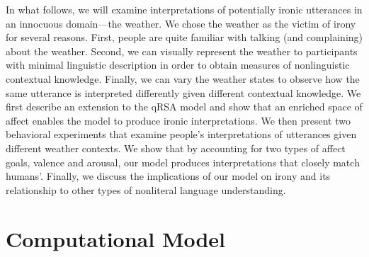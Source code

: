 \documentclass[10pt,letterpaper]{article}
\begin{document}




In what follows, we will examine interpretations of potentially ironic utterances in an innocuous domain---the weather. We chose the weather as the victim of irony for several reasons. First, people are quite familiar with talking (and complaining) about the weather. Second, we can visually represent the weather to participants with minimal linguistic description in order to obtain measures of nonlinguistic contextual knowledge. Finally, we can vary the weather states to observe how the same utterance is interpreted differently given different contextual knowledge. We first describe an extension to the qRSA model and show that an enriched space of affect enables the model to produce ironic interpretations. We then present two behavioral experiments that examine people's interpretations of utterances given different weather contexts. We show that by accounting for two types of affect goals, valence and arousal, our model produces interpretations that closely match humans'. Finally, we discuss the implications of our model on irony and its relationship to other types of nonliteral language understanding.


\section{Computational Model}


%
%
\end{document}
